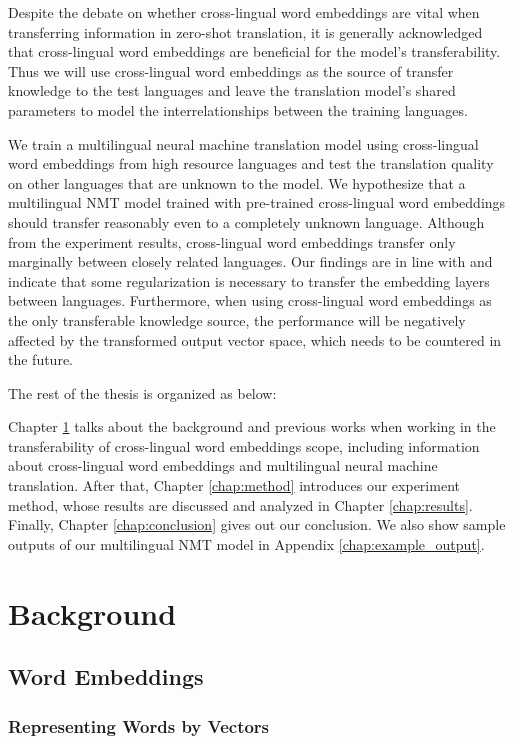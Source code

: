 \documentclass[thesis,fonts=libertine]{cluu}
\begin{document}
Despite the debate on whether cross-lingual word embeddings are vital when transferring information in zero-shot translation, it is generally acknowledged that cross-lingual word embeddings are beneficial for the model's transferability. Thus we will use cross-lingual word embeddings as the source of transfer knowledge to the test languages and leave the translation model's shared parameters to model the interrelationships between the training languages.

We train a multilingual neural machine translation model using cross-lingual word embeddings from high resource languages and test the translation quality on other languages that are unknown to the model. We hypothesize that a multilingual NMT model trained with pre-trained cross-lingual word embeddings should transfer reasonably even to a completely unknown language. Although from the experiment results, cross-lingual word embeddings transfer only marginally between closely related languages. Our findings are in line with \textcite{aji-etal-2020-neural} and indicate that some regularization is necessary to transfer the embedding layers between languages. Furthermore, when using cross-lingual word embeddings as the only transferable knowledge source, the performance will be negatively affected by the transformed output vector space, which needs to be countered in the future.

The rest of the thesis is organized as below:

Chapter \ref{chap:background} talks about the background and previous works when working in the transferability of cross-lingual word embeddings scope, including information about cross-lingual word embeddings and multilingual neural machine translation. After that, Chapter \ref{chap:method} introduces our experiment method, whose results are discussed and analyzed in Chapter \ref{chap:results}. Finally, Chapter \ref{chap:conclusion} gives out our conclusion. We also show sample outputs of our multilingual NMT model in Appendix \ref{chap:example_output}.

\chapter{Background}
\label{chap:background}

\section{Word Embeddings}
\subsection{Representing Words by Vectors}
\end{document}
